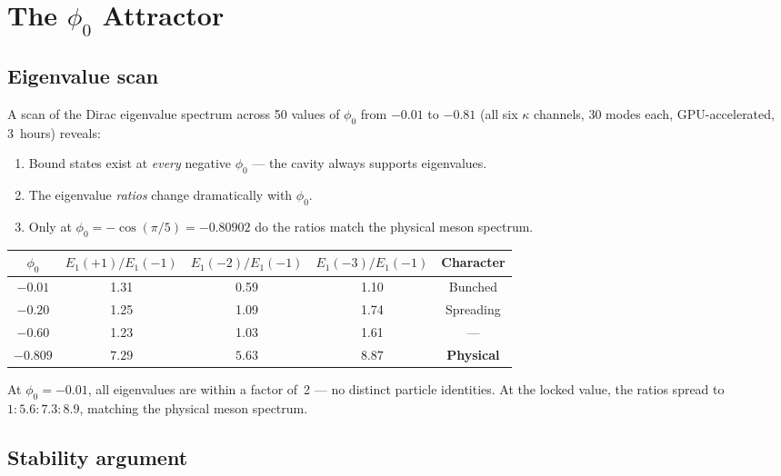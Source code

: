 \documentclass[11pt,letterpaper]{article}
\numberwithin{equation}{section}
\begin{document}
\section{The $\phi_0$ Attractor}

\subsection{Eigenvalue scan}

A scan of the Dirac eigenvalue spectrum across 50 values of $\phi_0$
from $-0.01$ to $-0.81$ (all six $\kappa$ channels, 30 modes each,
GPU-accelerated, 3~hours) reveals:

\begin{enumerate}
\item Bound states exist at \emph{every} negative $\phi_0$ --- the
  cavity always supports eigenvalues.
\item The eigenvalue \emph{ratios} change dramatically with $\phi_0$.
\item Only at $\phi_0 = -\cos(\pi/5) = -0.80902$ do the ratios match
  the physical meson spectrum.
\end{enumerate}

\begin{center}
\begin{tabular}{ccccc}
\toprule
$\phi_0$ & $E_1(+1)/E_1(-1)$ & $E_1(-2)/E_1(-1)$ &
  $E_1(-3)/E_1(-1)$ & Character \\
\midrule
$-0.01$ & 1.31 & 0.59 & 1.10 & Bunched \\
$-0.20$ & 1.25 & 1.09 & 1.74 & Spreading \\
$-0.60$ & 1.23 & 1.03 & 1.61 & --- \\
$\mathbf{-0.809}$ & $\mathbf{7.29}$ & $\mathbf{5.63}$ &
  $\mathbf{8.87}$ & \textbf{Physical} \\
\bottomrule
\end{tabular}
\end{center}

At $\phi_0 = -0.01$, all eigenvalues are within a factor of~2 --- no
distinct particle identities.  At the locked value, the ratios spread
to $1:5.6:7.3:8.9$, matching the physical meson spectrum.

\subsection{Stability argument}
\end{document}
